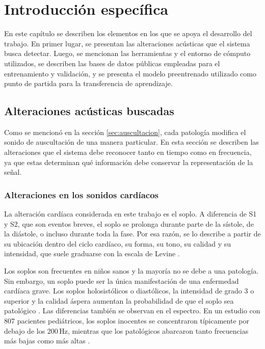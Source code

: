 \chapter{Introducción específica} %

\label{Chapter2}

En este capítulo se describen los elementos en los que se apoya el desarrollo del trabajo. En primer
lugar, se presentan las alteraciones acústicas que el sistema busca detectar. Luego, se mencionan
las herramientas y el entorno de cómputo utilizados, se describen las bases de datos públicas
empleadas para el entrenamiento y validación, y se presenta el modelo preentrenado utilizado como
punto de partida para la transferencia de aprendizaje.


\section{Alteraciones acústicas buscadas}
\label{sec:alteraciones}

Como se mencionó en la sección \ref{sec:auscultacion}, cada patología modifica el sonido de
auscultación de una manera particular. En esta sección se describen las alteraciones que el sistema
debe reconocer tanto en tiempo como en frecuencia, ya que estas determinan qué información debe
conservar la representación de la señal.

\subsection{Alteraciones en los sonidos cardíacos}
\label{subsec:alteracionesCardiacas}

La alteración cardíaca considerada en este trabajo es el soplo. A diferencia de S1 y S2, que son
eventos breves, el soplo se prolonga durante parte de la sístole, de la diástole, o incluso durante
toda la fase. Por esa razón, se lo describe a partir de su ubicación dentro del ciclo cardíaco, su
forma, su tono, su calidad y su intensidad, que suele graduarse con la escala de Levine
\citep{oliveira2022circor}.

Los soplos son frecuentes en niños sanos y la mayoría no se debe a una patología. Sin embargo, un
soplo puede ser la única manifestación de una enfermedad cardíaca grave. Los soplos holosistólicos o
diastólicos, la intensidad de grado 3 o superior y la calidad áspera aumentan la probabilidad de que
el soplo sea patológico \citep{frank2011evaluation}. Las diferencias también se observan en el
espectro. En un estudio con 807 pacientes pediátricos, los soplos inocentes se concentraron
típicamente por debajo de los 200\,Hz, mientras que los patológicos abarcaron tanto frecuencias más
bajas como más altas \citep{noponen2007phono}.

